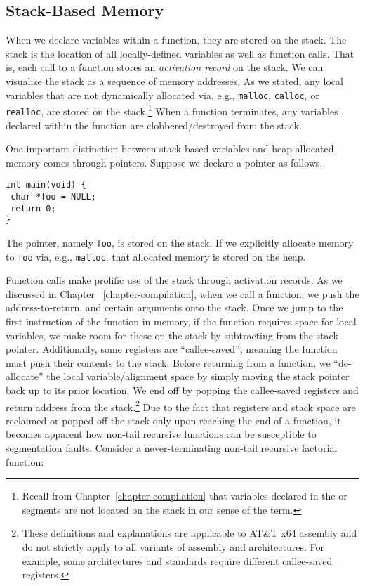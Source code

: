 \subsection*{Stack-Based Memory}

When we declare variables within a function, they are stored on the stack. The stack is the location of all locally-defined variables as well as function calls. That is, each call to a function stores an \textit{activation record} on the stack. We can visualize the stack as a sequence of memory addresses. 
As we stated, any local variables that are not dynamically allocated via, e.g., \texttt{malloc}, \texttt{calloc}, or \texttt{realloc}, are stored on the stack.\footnote{Recall from Chapter~\ref{chapter-compilation} that variables declared in the  or  segments are not located on the stack in our sense of the term.} When a function terminates, any variables declared within the function are clobbered/destroyed from the stack. 

One important distinction between stack-based variables and heap-allocated memory comes through pointers. Suppose we declare a pointer as follows.

\begin{cl}[]{}\begin{lstlisting}[language=MyC]
int main(void) {
 char *foo = NULL;
 return 0;
}
\end{lstlisting}\end{cl}

The pointer, namely \texttt{foo}, is stored on the stack. If we explicitly allocate memory to \texttt{foo} via, e.g., \texttt{malloc}, that allocated memory is stored on the heap. 

Function calls make prolific use of the stack through activation records. As we discussed in Chapter ~\ref{chapter-compilation}, when we call a function, we push the address-to-return, and certain arguments onto the stack. Once we jump to the first instruction of the function in memory, if the function requires space for local variables, we make room for these on the stack by subtracting from the stack pointer. Additionally, some registers are ``callee-saved'', meaning the function must push their contents to the stack. Before returning from a function, we ``de-allocate'' the local variable/alignment space by simply moving the stack pointer back up to its prior location. We end off by popping the callee-saved registers and return address from the stack.\footnote{These definitions and explanations are applicable to AT\&T x64 assembly and do not strictly apply to all variants of assembly and architectures. For example, some architectures and standards require different callee-saved registers.} Due to the fact that registers and stack space are reclaimed or popped off the stack only upon reaching the end of a function, it becomes apparent how non-tail recursive functions can be susceptible to segmentation faults. Consider a never-terminating non-tail recursive factorial function:

